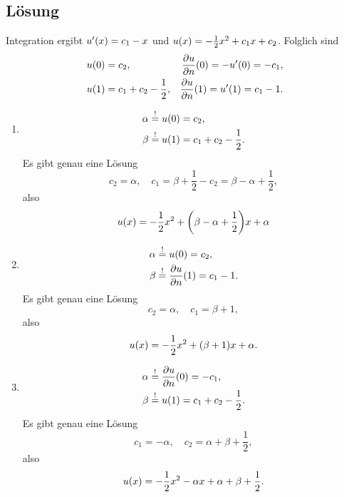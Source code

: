 \documentclass{exercise}
\begin{document}
    \subsection*{Lösung}
    Integration ergibt \(u'\parentheses*{x} = c_1 - x\) und \(u\parentheses*{x} = -\frac{1}{2}x^2 + c_1 x + c_2\).
    Folglich sind
    \begin{align*}
        u\parentheses*{0} &= c_2, & \frac{\partial u}{\partial n}\parentheses*{0} = -u'\parentheses*{0} = -c_1,\\
        u\parentheses*{1} &= c_1 + c_2 - \frac{1}{2}, & \frac{\partial u}{\partial n}\parentheses*{1} = u'\parentheses*{1} = c_1 - 1.
    \end{align*}
    \begin{enumerate}
        \item
        \begin{align*}
            \alpha &\stackrel{!}{=} u\parentheses*{0} = c_2,\\
            \beta &\stackrel{!}{=} u\parentheses*{1} = c_1 + c_2 - \frac{1}{2}.
        \end{align*}
        Es gibt genau eine Lösung
        \[
            c_2 = \alpha, \quad c_1 = \beta + \frac{1}{2} - c_2 = \beta - \alpha + \frac{1}{2},
        \]
        also
        \[
            u\parentheses*{x} = -\frac{1}{2}x^2 + \parentheses*{\beta - \alpha + \frac{1}{2}}x + \alpha
        \]
        \item
        \begin{align*}
            \alpha &\stackrel{!}{=} u\parentheses*{0} = c_2,\\
            \beta &\stackrel{!}{=} \frac{\partial u}{\partial n}\parentheses*{1} = c_1 - 1.
        \end{align*}
        Es gibt genau eine Lösung
        \[
            c_2 = \alpha, \quad c_1 = \beta + 1,
        \]
        also
        \[
            u\parentheses*{x} = -\frac{1}{2}x^2 + \parentheses*{\beta + 1}x + \alpha.
        \]
        \item
        \begin{align*}
            \alpha &\stackrel{!}{=} \frac{\partial u}{\partial n}\parentheses*{0} = -c_1,\\
            \beta &\stackrel{!}{=} u\parentheses*{1} = c_1 + c_2 - \frac{1}{2}.
        \end{align*}
        Es gibt genau eine Lösung
        \[
            c_1 = -\alpha, \quad c_2 = \alpha + \beta + \frac{1}{2},
        \]
        also
        \[
            u\parentheses*{x} = -\frac{1}{2}x^2 - \alpha x + \alpha + \beta + \frac{1}{2}.
\]
\end{enumerate}
\end{document}
